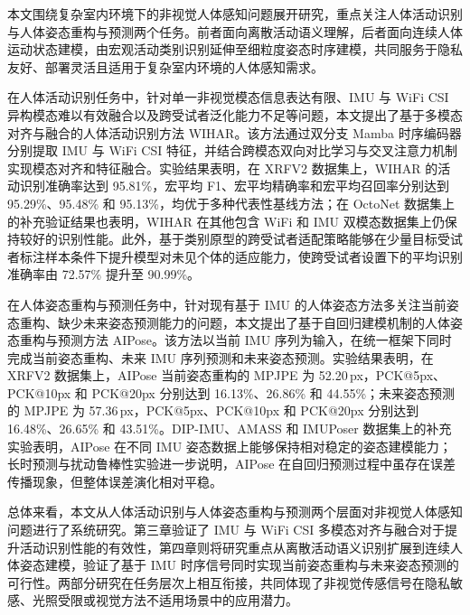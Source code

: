 


本文围绕复杂室内环境下的非视觉人体感知问题展开研究，重点关注人体活动识别与人体姿态重构与预测两个任务。前者面向离散活动语义理解，后者面向连续人体运动状态建模，由宏观活动类别识别延伸至细粒度姿态时序建模，共同服务于隐私友好、部署灵活且适用于复杂室内环境的人体感知需求。

在人体活动识别任务中，针对单一非视觉模态信息表达有限、IMU 与 WiFi CSI 异构模态难以有效融合以及跨受试者泛化能力不足等问题，本文提出了基于多模态对齐与融合的人体活动识别方法 WIHAR。该方法通过双分支 Mamba 时序编码器分别提取 IMU 与 WiFi CSI 特征，并结合跨模态双向对比学习与交叉注意力机制实现模态对齐和特征融合。实验结果表明，在 XRFV2 数据集上，WIHAR 的活动识别准确率达到 95.81\%，宏平均 F1、宏平均精确率和宏平均召回率分别达到 95.29\%、95.48\% 和 95.13\%，均优于多种代表性基线方法；在 OctoNet 数据集上的补充验证结果也表明，WIHAR 在其他包含 WiFi 和 IMU 双模态数据集上仍保持较好的识别性能。此外，基于类别原型的跨受试者适配策略能够在少量目标受试者标注样本条件下提升模型对未见个体的适应能力，使跨受试者设置下的平均识别准确率由 72.57\% 提升至 90.99\%。

在人体姿态重构与预测任务中，针对现有基于 IMU 的人体姿态方法多关注当前姿态重构、缺少未来姿态预测能力的问题，本文提出了基于自回归建模机制的人体姿态重构与预测方法 AIPose。该方法以当前 IMU 序列为输入，在统一框架下同时完成当前姿态重构、未来 IMU 序列预测和未来姿态预测。实验结果表明，在 XRFV2 数据集上，AIPose 当前姿态重构的 MPJPE 为 52.20\,px，PCK@5px、PCK@10px 和 PCK@20px 分别达到 16.13\%、26.86\% 和 44.55\%；未来姿态预测的 MPJPE 为 57.36\,px，PCK@5px、PCK@10px 和 PCK@20px 分别达到 16.48\%、26.65\% 和 43.51\%。DIP-IMU、AMASS 和 IMUPoser 数据集上的补充实验表明，AIPose 在不同 IMU 姿态数据上能够保持相对稳定的姿态建模能力；长时预测与扰动鲁棒性实验进一步说明，AIPose 在自回归预测过程中虽存在误差传播现象，但整体误差演化相对平稳。

总体来看，本文从人体活动识别与人体姿态重构与预测两个层面对非视觉人体感知问题进行了系统研究。第三章验证了 IMU 与 WiFi CSI 多模态对齐与融合对于提升活动识别性能的有效性，第四章则将研究重点从离散活动语义识别扩展到连续人体姿态建模，验证了基于 IMU 时序信号同时实现当前姿态重构与未来姿态预测的可行性。两部分研究在任务层次上相互衔接，共同体现了非视觉传感信号在隐私敏感、光照受限或视觉方法不适用场景中的应用潜力。


